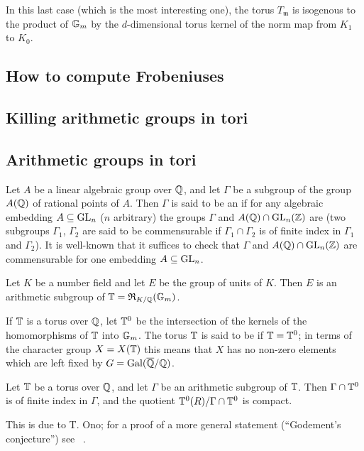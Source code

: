 \begin{obs}
In this last case (which is the most interesting one), the torus
$T_{\mathfrak{m}}$ is isogenous to the product of $\mathbb{G}_m$ by the
$d$-dimensional torus kernel of the norm map from $K_1$ to $K_0$.
\end{obs}

\subsection{How to compute Frobeniuses}
\label{sec:II_34}

\begin{subappendices}
\section{Killing arithmetic groups in tori}

\subsection{Arithmetic groups in tori}
Let $A$ be a linear algebraic group over $\mathbb{Q}$, and let $\Gamma$ be a subgroup
of the group $A(\mathbb{Q})$ of rational points of $A$. Then $\Gamma$ is said to be an
 if for any algebraic
embedding
\dpage
$A \subseteq \operatorname{GL}_n$ ($n$ arbitrary) the groups $\Gamma$ and $A(\mathbb{Q}) \cap
\operatorname{GL}_n(\mathbb{Z})$ are  (two
subgroups $\Gamma_1$, $\Gamma_2$ are said to be commensurable if $\Gamma_1 \cap
\Gamma_2$ is of finite index in $\Gamma_1$ and $\Gamma_2$). It is well-known
that it suffices to check that $\Gamma$ and $A(\mathbb{Q}) \cap \operatorname{GL}_n(\mathbb{Z})$ are
commensurable for one embedding $A \subseteq \operatorname{GL}_n$.

\begin{ex}
Let $K$ be a number field and let $E$ be the group of units of $K$.
Then $E$ is an arithmetic subgroup of $\mathbb{T} = \operatorname{\mathfrak{R}}_{K/\mathbb{Q}}(\mathbb{G}_m)$.
\end{ex}
If $\mathbb{T}$ is a torus over $\mathbb{Q}$, let $\mathbb{T}^0$ be the intersection of the kernels
of the homomorphisms of $\mathbb{T}$ into $\mathbb{G}_m$. The torus $\mathbb{T}$ is said to be
 if $\mathbb{T} = \mathbb{T}^0$; in terms of
the character group $X = X(\mathbb{T})$ this means that $X$ has no non-zero elements
which are left fixed by $G = \operatorname{Gal}(\overline{\mathbb{Q}}/\mathbb{Q})$.

\begin{thm}
Let $\mathbb{T}$ be a torus over $\mathbb{Q}$, and let $\Gamma$ be an arithmetic subgroup of
$\mathbb{T}$. Then $\Gamma \cap \mathbb{T}^0$ is of finite index in $\Gamma$, and the
quotient $\mathbb{T}^0(R)/\Gamma \cap \mathbb{T}^0$ is compact.
\end{thm}
This is due to T. Ono; for a proof of a more general statement (``Godement's
conjecture'') see \citeauthor{18}~\cite{18}.


\end{subappendices}
